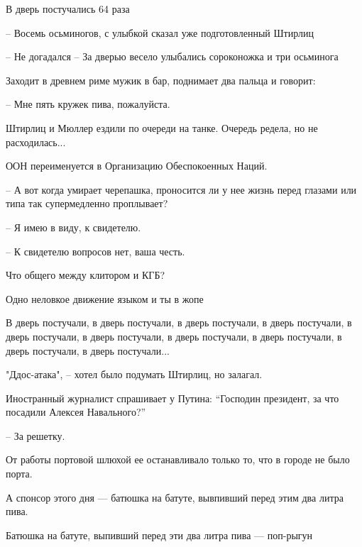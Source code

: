 \bigbreak

В дверь постучались 64 раза

-- Восемь осьминогов, с улыбкой сказал уже подготовленный Штирлиц

-- Не догадался -- За дверью весело улыбались сороконожка и три осьминога

\bigbreak

Заходит в древнем риме мужик в бар, поднимает два пальца и говорит:

-- Мне пять кружек пива, пожалуйста.

\bigbreak

Штирлиц и Мюллер ездили по очереди на танке. Очередь редела, но не расходилась...

\bigbreak

ООН переименуется в Организацию Обеспокоенных Наций.

\bigbreak

-- А вот когда умирает черепашка, проносится ли у нее жизнь перед глазами или типа так супермедленно проплывает?

-- Я имею в виду, к свидетелю.

-- К свидетелю вопросов нет, ваша честь.

\bigbreak

Что общего между клитором и КГБ? 

Одно неловкое движение языком и ты в жопе

\bigbreak

В дверь постучали, в дверь постучали, в дверь постучали, в дверь постучали, в дверь постучали, в дверь постучали, в дверь постучали, в дверь постучали, в дверь постучали, в дверь постучали...

"Ддос-атака", -- хотел было подумать Штирлиц, но залагал.

\bigbreak

Иностранный журналист спрашивает у Путина: ``Господин президент, за что посадили Алексея Навального?''

-- За решетку.

\bigbreak

От работы портовой шлюхой ее останавливало только то, что в городе не было порта.

\bigbreak

А спонсор этого дня --- батюшка на батуте, вывпивший перед этим два литра пива. 

Батюшка на батуте, выпивший перед эти два литра пива --- поп-рыгун

\bigbreak

